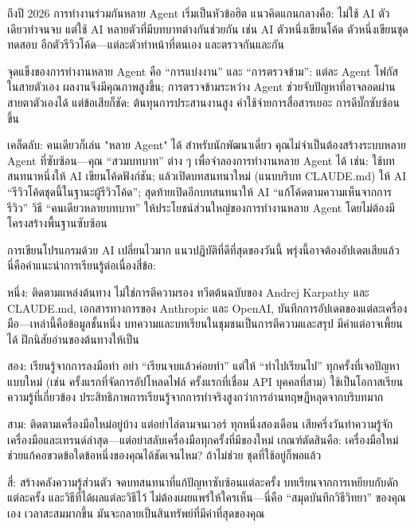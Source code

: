 ถึงปี 2026 การทำงานร่วมกันหลาย Agent เริ่มเป็นหัวข้อฮิต แนวคิดแกนกลางคือ: ไม่ใช้ AI ตัวเดียวทำจนจบ แต่ใช้ AI หลายตัวที่มีบทบาทต่างกันช่วยกัน เช่น AI ตัวหนึ่งเขียนโค้ด ตัวหนึ่งเขียนชุดทดสอบ อีกตัวรีวิวโค้ด—แต่ละตัวทำหน้าที่ตนเอง และตรวจกันและกัน

จุดแข็งของการทำงานหลาย Agent คือ “การแบ่งงาน” และ “การตรวจข้าม”: แต่ละ Agent โฟกัสในสายตัวเอง ผลงานจึงมีคุณภาพสูงขึ้น; การตรวจข้ามระหว่าง Agent ช่วยจับปัญหาที่อาจลอดผ่านสายตาตัวเองได้ แต่ข้อเสียก็ชัด: ต้นทุนการประสานงานสูง ค่าใช้จ่ายการสื่อสารเยอะ การดีบั๊กซับซ้อนขึ้น

\begin{tcbinfo}{เคล็ดลับ: คนเดียวก็เล่น "หลาย Agent" ได้}
สำหรับนักพัฒนาเดี่ยว คุณไม่จำเป็นต้องสร้างระบบหลาย Agent ที่ซับซ้อน—คุณ “สวมบทบาท” ต่าง ๆ เพื่อจำลองการทำงานหลาย Agent ได้ เช่น: ใช้บทสนทนาหนึ่งให้ AI เขียนโค้ดฟังก์ชัน; แล้วเปิดบทสนทนาใหม่ (แนบบริบท CLAUDE.md) ให้ AI “รีวิวโค้ดชุดนี้ในฐานะผู้รีวิวโค้ด”; สุดท้ายเปิดอีกบทสนทนาให้ AI “แก้โค้ดตามความเห็นจากการรีวิว” วิธี “คนเดียวหลายบทบาท” ให้ประโยชน์ส่วนใหญ่ของการทำงานหลาย Agent โดยไม่ต้องมีโครงสร้างพื้นฐานซับซ้อน

\end{tcbinfo}


การเขียนโปรแกรมด้วย AI เปลี่ยนไวมาก แนวปฏิบัติที่ดีที่สุดของวันนี้ พรุ่งนี้อาจต้องอัปเดตเสียแล้ว นี่คือคำแนะนำการเรียนรู้ต่อเนื่องสี่ข้อ:

หนึ่ง: ติดตามแหล่งต้นทาง ไม่ใช่การตีความรอง ทวีตต้นฉบับของ Andrej Karpathy และ CLAUDE.md, เอกสารทางการของ Anthropic และ OpenAI, บันทึกการอัปเดตของแต่ละเครื่องมือ—เหล่านี้คือข้อมูลชั้นหนึ่ง บทความและบทเรียนในชุมชนเป็นการตีความและสรุป มีค่าแต่อาจเพี้ยนได้ ฝึกนิสัยอ่านของต้นทางให้เป็น

สอง: เรียนรู้จากการลงมือทำ อย่า “เรียนจบแล้วค่อยทำ” แต่ให้ “ทำไปเรียนไป” ทุกครั้งที่เจอปัญหาแบบใหม่ (เช่น ครั้งแรกที่จัดการอัปโหลดไฟล์ ครั้งแรกที่เชื่อม API บุคคลที่สาม) ใช้เป็นโอกาสเรียนความรู้ที่เกี่ยวข้อง ประสิทธิภาพการเรียนรู้จากการทำจริงสูงกว่าการอ่านทฤษฎีหลุดจากบริบทมาก

สาม: ติดตามเครื่องมือใหม่อยู่บ้าง แต่อย่าไล่ตามจนเวอร์ ทุกหนึ่งสองเดือน เสียครึ่งวันทำความรู้จักเครื่องมือและเทรนด์ล่าสุด—แต่อย่าสลับเครื่องมือทุกครั้งที่มีของใหม่ เกณฑ์ตัดสินคือ: เครื่องมือใหม่ช่วยแก้คอขวดข้อใดข้อหนึ่งของคุณได้ชัดเจนไหม? ถ้าไม่ช่วย ชุดที่ใช้อยู่ก็พอแล้ว

สี่: สร้างคลังความรู้ส่วนตัว จดบทสนทนาที่แก้ปัญหาซับซ้อนแต่ละครั้ง บทเรียนจากการเหยียบกับดักแต่ละครั้ง และวิธีที่ได้ผลแต่ละวิธีไว้ ไม่ต้องเผยแพร่ให้ใครเห็น—นี่คือ “สมุดบันทึกวิธีวิทยา” ของคุณเอง เวลาสะสมมากขึ้น มันจะกลายเป็นสินทรัพย์ที่มีค่าที่สุดของคุณ

